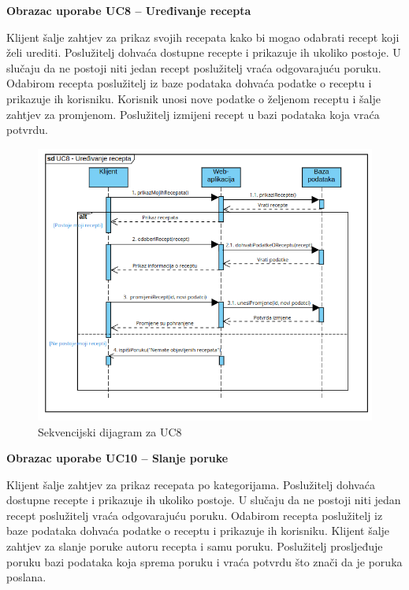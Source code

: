 				\textbf{Obrazac uporabe UC8 – Uređivanje recepta}

				Klijent šalje zahtjev za prikaz svojih recepata kako bi mogao 
				odabrati recept koji želi urediti. Poslužitelj dohvaća dostupne recepte 
				i prikazuje ih ukoliko postoje. U slučaju da ne postoji niti jedan recept 
				poslužitelj vraća odgovarajuću poruku. Odabirom recepta poslužitelj iz 
				baze podataka dohvaća podatke o receptu i prikazuje ih korisniku. 
				Korisnik unosi nove podatke o željenom receptu i šalje zahtjev za 
				promjenom. Poslužitelj izmijeni recept u bazi podataka koja vraća potvrdu.

				\begin{figure}[H]
					\includegraphics[scale=0.6]{dijagrami/SD8.png} 
					\centering
					\caption{Sekvencijski dijagram za UC8}
					\label{fig:sd8}
				\end{figure}		
				\eject
				
				\textbf{Obrazac uporabe UC10 – Slanje poruke}

				Klijent šalje zahtjev za prikaz recepata po kategorijama. Poslužitelj 
				dohvaća dostupne recepte i prikazuje ih ukoliko postoje. U slučaju 
				da ne postoji niti jedan recept poslužitelj vraća odgovarajuću poruku. 
				Odabirom recepta poslužitelj iz baze podataka dohvaća podatke o receptu 
				i prikazuje ih korisniku. Klijent šalje zahtjev za slanje poruke autoru 
				recepta i samu poruku. Poslužitelj prosljeđuje poruku bazi podataka koja 
				sprema poruku i vraća potvrdu što znači da je poruka poslana.
					
